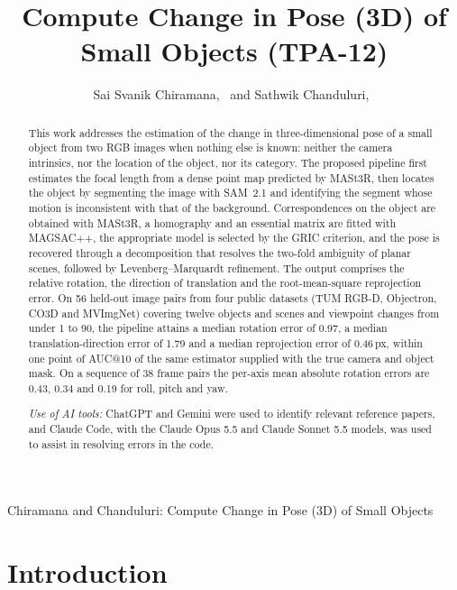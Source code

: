 \documentclass[journal]{IEEEtran}
\begin{document}
\title{Compute Change in Pose (3D) of Small Objects (TPA-12)}
\author{Sai Svanik Chiramana,~
        and Sathwik Chanduluri,~%
}
%
{Chiramana and Chanduluri: Compute Change in Pose (3D) of Small Objects}
\maketitle

\begin{abstract}
This work addresses the estimation of the change in three-dimensional pose of a small object from two RGB images when nothing else is known: neither the camera intrinsics, nor the location of the object, nor its category. The proposed pipeline first estimates the focal length from a dense point map predicted by MASt3R, then locates the object by segmenting the image with SAM~2.1 and identifying the segment whose motion is inconsistent with that of the background. Correspondences on the object are obtained with MASt3R, a homography and an essential matrix are fitted with MAGSAC++, the appropriate model is selected by the GRIC criterion, and the pose is recovered through a decomposition that resolves the two-fold ambiguity of planar scenes, followed by Levenberg--Marquardt refinement. The output comprises the relative rotation, the direction of translation and the root-mean-square reprojection error. On 56 held-out image pairs from four public datasets (TUM RGB-D, Objectron, CO3D and MVImgNet) covering twelve objects and scenes and viewpoint changes from under 1\textdegree{} to 90\textdegree{}, the pipeline attains a median rotation error of 0.97\textdegree{}, a median translation-direction error of 1.79\textdegree{} and a median reprojection error of 0.46\,px, within one point of AUC@10\textdegree{} of the same estimator supplied with the true camera and object mask. On a sequence of 38 frame pairs the per-axis mean absolute rotation errors are 0.43\textdegree{}, 0.34\textdegree{} and 0.19\textdegree{} for roll, pitch and yaw.



\noindent\textit{Use of AI tools:} ChatGPT and Gemini were used to identify relevant reference papers, and Claude Code, with the Claude Opus 5.5 and Claude Sonnet 5.5 models, was used to assist in resolving errors in the code.
\end{abstract}

\IEEEpeerreviewmaketitle

\section{Introduction}
\end{document}
